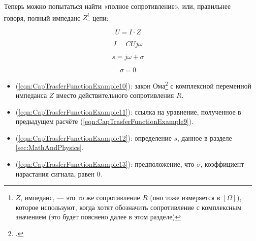 \documentclass[a4paper, 10pt, final]{article} %
\begin{document}
    \noindent Теперь можно попытаться найти «полное сопротивление», или, правильнее говоря, полный импеданс $Z$\footnote{$Z$, импеданс, --- это то же сопротивление $R$ (оно тоже измеряется в $[\Omega]$), которое используют, когда хотят обозначить сопротивление с комплексным значением (это будет пояснено далее в этом разделе)} цепи:
    \begin{figure}[H]
        \centering
        \begin{minipage}[b]{.21\linewidth}
            \centering
            \begin{equation} \label{eqn:CapTrasferFunctionExample10}
                U = I \cdot Z
            \end{equation}
        \end{minipage}
        \hspace{0.04\linewidth}
        \begin{minipage}[b]{.21\linewidth}
            \centering
            \begin{equation} \label{eqn:CapTrasferFunctionExample11}
                I = C U j \omega
            \end{equation}
        \end{minipage}
        \hspace{0.04\linewidth}
        \begin{minipage}[b]{.21\linewidth}
            \centering
            \begin{equation} \label{eqn:CapTrasferFunctionExample12}
                s = j\omega + \sigma
            \end{equation}
        \end{minipage}
        \hspace{0.04\linewidth}
        \begin{minipage}[b]{.21\linewidth}
            \centering
            \begin{equation} \label{eqn:CapTrasferFunctionExample13}
                \sigma = 0
            \end{equation}
        \end{minipage}
    \end{figure}
    \begin{itemize}
        \item (\ref{eqn:CapTrasferFunctionExample10}): закон Ома\footcite[]{Ohm:Wiki} с комплексной переменной импеданса $Z$ вместо действительного сопротивления $R$.
        \item (\ref{eqn:CapTrasferFunctionExample11}): ссылка на уравнение, полученное в предыдущем расчёте (\ref{eqn:CapTrasferFunctionExample9}).
        \item (\ref{eqn:CapTrasferFunctionExample12}): определение $s$, данное в разделе \ref{sec:MathAndPhysics}.
        \item (\ref{eqn:CapTrasferFunctionExample13}): предположение, что $\sigma$, коэффициент нарастания сигнала, равен $0$.
    \end{itemize}
\end{document}
